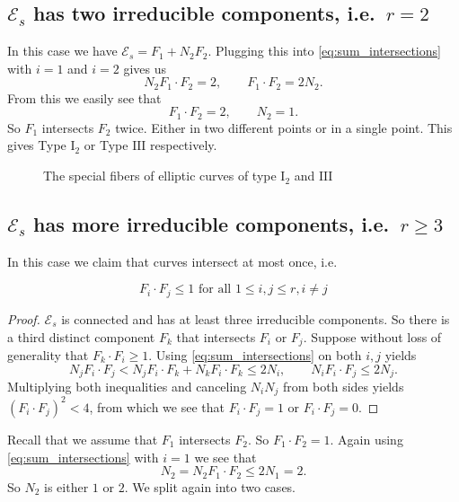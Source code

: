 \subsection{$\mathscr E _s$ has two irreducible components, i.e.\ $r  = 2$} \label{sec:C_s_has_two_irreducible_components}
In this case we have $\mathscr E _s = F_1 + N_2F_2$. 
Plugging this into \eqref{eq:sum_intersections} with $i = 1$ and  $i = 2$ gives us \[
N_2 F_1 \cdot F_2 = 2, \qquad F_1 \cdot F_2 = 2 N_2
.\] 
From this we easily see that 
 \[
F_1 \cdot F_2 = 2, \qquad N_2 = 1
.\] 
So $F_1$ intersects $F_2$ twice. Either in two different points or in a single point. This gives Type  $\text{I}_2$ or Type $\text{III}$ respectively. 

\begin{figure}[ht]
    \centering
    \caption{The special fibers of elliptic curves of type $\text{I}_2$ and $\mathrm{III}$}
    \label{fig:type-i-and-iii}
\end{figure}


\subsection{$\mathscr E _s$ has more irreducible components, i.e.\ $r \ge 3$} \label{sec:S_s_has_more_irreducible_components}

In this case we claim that curves intersect at most once, i.e. 
\begin{claim}
\[
	F_i \cdot F_j \le 1 \text{ for all }  1 \le i, j \le r, i \ne j
\]
\end{claim}
\begin{proof}
	$\mathscr E _s$ is connected and has at least three irreducible components. 
	So there is a third distinct component $F_k$ that intersects $F_i$ or $F_j$. Suppose without loss of generality that  $F_k \cdot F_i \ge 1$. 
	Using \eqref{eq:sum_intersections} on both  $i, j$ yields \[
	N_j F_i \cdot F_j < N_j F_i \cdot  F_k + N_k F_i \cdot  F_k \le 2N_i, \qquad N_i F_i \cdot F_j \le 2 N_j
	.\] 
	Multiplying both inequalities and canceling $N_i N_j$ from both sides yields $(F_i \cdot  F_j)^2 < 4$, from which we see that $F_i \cdot  F_j = 1$ or $F_i \cdot F_j = 0$. 
\end{proof}

Recall that we assume that $F_1$ intersects $F_2$. So $F_1 \cdot  F_2 = 1$. 
Again using  \eqref{eq:sum_intersections} with $i = 1$ we see that \[
N_2 = N_2 F_1 \cdot F_2 \le 2N_1 = 2
.\] 
So $N_2$ is either $1$ or $2$. We split again into two cases. 

